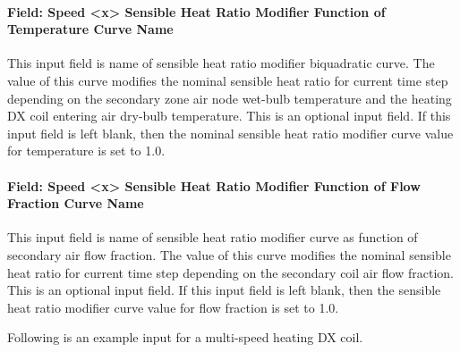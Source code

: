 \paragraph{Field: Speed \textless{}x\textgreater{} Sensible Heat Ratio Modifier Function of Temperature Curve Name}\label{field-speed-x-sensible-heat-ratio-modifier-function-of-temperature-curve-name}

This input field is name of sensible heat ratio modifier biquadratic curve. The value of this curve modifies the nominal sensible heat ratio for current time step depending on the secondary zone air node wet-bulb temperature and the heating DX coil entering air dry-bulb temperature. This is an optional input field. If this input field is left blank, then the nominal sensible heat ratio modifier curve value for temperature is set to 1.0.

\paragraph{Field: Speed \textless{}x\textgreater{} Sensible Heat Ratio Modifier Function of Flow Fraction Curve Name}\label{field-speed-x-sensible-heat-ratio-modifier-function-of-flow-fraction-curve-name}

This input field is name of sensible heat ratio modifier curve as function of secondary air flow fraction. The value of this curve modifies the nominal sensible heat ratio for current time step depending on the secondary coil air flow fraction. This is an optional input field. If this input field is left blank, then the sensible heat ratio modifier curve value for flow fraction is set to 1.0.

Following is an example input for a multi-speed heating DX coil.

